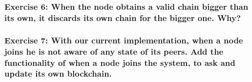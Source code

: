 \documentclass[12pt,a4paper]{article}
\theoremstyle{definition}
\begin{document}
\subsubsection*{Exercise 6: When the node obtains a valid chain bigger than its own, it discards its own chain for the bigger one. Why? }

\subsubsection*{Exercise 7: With our current implementation, when a node joins he is not aware of any state of its peers. Add the functionality of when a node joins the system, to ask and update its own blockchain.}



\end{document}
